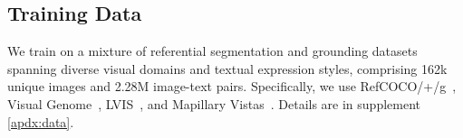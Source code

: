\subsection{Training Data}
\label{sec:data}
We train on a mixture of referential segmentation and grounding datasets spanning diverse visual domains and textual expression styles, comprising 162k unique images and 2.28M image-text pairs. Specifically, we use RefCOCO/+/g~\cite{kazemzadeh2014referitgame, yu2016refcocog}, Visual Genome~\cite{krishna2017visual}, LVIS~\cite{gupta2019lvis}, and Mapillary Vistas~\cite{neuhold2017mapillary}.
Details are in supplement \ref{apdx:data}.
